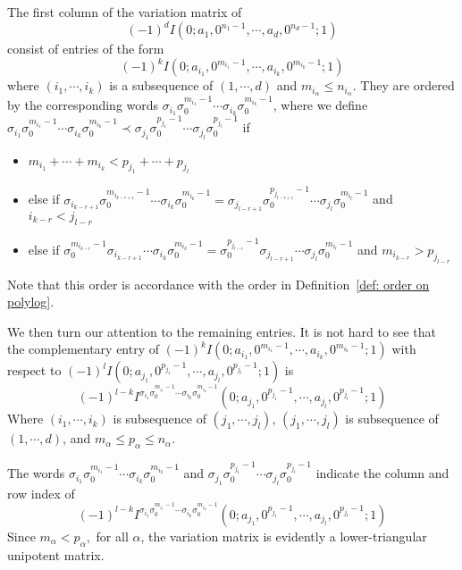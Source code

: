 \begin{proposition}\label{prop: structure of variation matrix}
The first column of the variation matrix of 
\[
(-1)^dI(0;a_1,0^{n_1-1},\cdots,a_d,0^{n_d-1};1)
\]
consist of entries of the form
\[
(-1)^kI(0;a_{i_1},0^{m_{i_1}-1},\cdots,a_{i_k},0^{m_{i_k}-1};1)
\]
where $(i_1,\cdots,i_k)$ is a subsequence of $(1,\cdots,d)$ and $m_{i_\alpha}\leq n_{i_\alpha}$. They are ordered by the corresponding words $\sigma_{i_1}\sigma_0^{m_{i_1}-1}\cdots\sigma_{i_k}\sigma_0^{m_{i_k}-1}$, where we define $\sigma_{i_1}\sigma_0^{m_{i_1}-1}\cdots\sigma_{i_k}\sigma_0^{m_{i_k}-1}\prec\sigma_{j_1}\sigma_0^{p_{j_1}-1}\cdots\sigma_{j_l}\sigma_0^{p_{j_l}-1}$ if
\begin{itemize}
\item $m_{i_1}+\cdots+m_{i_k}<p_{j_1}+\cdots+p_{j_l}$
\item  else if $\sigma_{i_{k-r+1}}\sigma_0^{m_{i_{k-r+1}}-1}\cdots\sigma_{i_k}\sigma_0^{m_{i_k}-1}=\sigma_{j_{l-r+1}}\sigma_0^{p_{j_{l-r+1}}-1}\cdots\sigma_{j_l}\sigma_0^{m_{i_l}-1}$ and $i_{k-r}<j_{l-r}$
\item  else if $\sigma_0^{m_{i_{k-r}}-1}\sigma_{i_{k-r+1}}\cdots\sigma_{i_k}\sigma_0^{m_{i_k}-1}=\sigma_0^{p_{j_{l-r}}-1}\sigma_{j_{l-r+1}}\cdots\sigma_{j_l}\sigma_0^{m_{i_l}-1}$ and $m_{i_{k-r}}>p_{j_{l-r}}$
\end{itemize}
Note that this order is accordance with the order in Definition~\ref{def: order on polylog}.

We then turn our attention to the remaining entries. It is not hard to see that the complementary entry of $(-1)^kI(0;a_{i_1},0^{m_{i_1}-1},\cdots,a_{i_k},0^{m_{i_k}-1};1)$ with respect to $(-1)^lI(0;a_{j_1},0^{p_{j_1}-1},\cdots,a_{j_l},0^{p_{j_l}-1};1)$ is
\[
(-1)^{l-k}I^{\sigma_{i_1}\sigma_0^{m_{i_1}-1}\cdots\sigma_{i_k}\sigma_0^{m_{i_k}-1}}(0;a_{j_1},0^{p_{j_1}-1},\cdots,a_{j_l},0^{p_{j_l}-1};1)
\]
Where $(i_1,\cdots,i_k)$ is subsequence of $(j_1,\cdots,j_l)$, $(j_1,\cdots,j_l)$ is subsequence of $(1,\cdots,d)$, and $m_\alpha\leq p_\alpha\leq n_\alpha$.
\end{proposition}

\begin{remark}
The words $\sigma_{i_1}\sigma_0^{m_{i_1}-1}\cdots\sigma_{i_k}\sigma_0^{m_{i_k}-1}$ and $\sigma_{j_1}\sigma_0^{p_{j_1}-1}\cdots\sigma_{j_l}\sigma_0^{p_{j_l}-1}$ indicate the column and row index of
\[
(-1)^{l-k}I^{\sigma_{i_1}\sigma_0^{m_{i_1}-1}\cdots\sigma_{i_k}\sigma_0^{m_{i_k}-1}}(0;a_{j_1},0^{p_{j_1}-1},\cdots,a_{j_l},0^{p_{j_l}-1};1)
\]
Since $m_\alpha<p_\alpha,$ for all $\alpha$, the variation matrix is evidently a lower-triangular unipotent matrix.
\end{remark}

